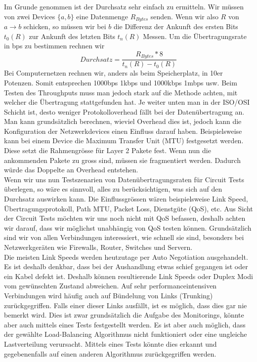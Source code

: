 \documentclass[a4,12pt]{scrartcl}
\begin{document}
\noindent Im Grunde genommen ist der Durchsatz sehr einfach zu ermitteln. Wir müssen von zwei Devices $\{a,b\}$ eine Datenmenge $R_{Bytes}$ senden. Wenn wir also $R$ von $a \rightarrow b$ schicken, so müssen wir bei $b$ die Differenz der Ankunft des ersten Bits $t_0(R)$ zur Ankunft des letzten Bits $t_n(R)$ Messen. Um die Übertragungsrate in bps zu bestimmen rechnen wir
\begin{equation}
Durchsatz = \frac{R_{Bytes} * 8}{t_n(R) - t_0(R)}  
\end{equation} 
Bei Computernetzen rechnen wir, anders als beim Speicherplatz, in 10er Potenzen. Somit entsprechen 1000bps 1kbps und 1000kbps 1mbps usw. Beim Testen des Throughputs muss man jedoch stark auf die Methode achten, mit welcher die Übertragung stattgefunden hat. Je weiter unten man in der ISO/OSI Schicht ist, desto weniger Protokolloverhead fällt bei der Datenübertragung an. Man kann grundsätzlich berechnen, wieviel Overhead dies ist, jedoch kann die Konfiguration der Netzwerkdevices einen Einfluss darauf haben. Beispielsweise kann bei einem Device die Maximum Transfer Unit (MTU) festgesetzt werden. Diese setzt die Rahmengrösse für Layer 2 Pakete fest. Wenn nun die ankommenden Pakete zu gross sind, müssen sie fragmentiert werden. Dadurch würde das Doppelte an Overhead entstehen.\\

\noindent Wenn wir uns nun Testszenarien von Datenübertragungsraten für Circuit Tests überlegen, so wäre es sinnvoll, alles zu berücksichtigen, was sich auf den Durchsatz auswirken kann. Die Einflussgrössen wären beispielsweise Link Speed, Übertragungsprotokoll, Path MTU, Packet Loss, Dienstgüte (QoS), etc. Aus Sicht der Circuit Tests möchten wir uns noch nicht mit QoS befassen, deshalb achten wir darauf, dass wir möglichst unabhängig von QoS testen können. Grundsätzlich sind wir von allen Verbindungen interessiert, wie schnell sie sind, besonders bei Netzwerkgeräten wie Firewalls, Router, Switches und Servern.\\

\noindent Die meisten Link Speeds werden heutzutage per Auto Negotiation ausgehandelt. Es ist deshalb denkbar, dass bei der Aushandlung etwas schief gegangen ist oder ein Kabel defekt ist. Deshalb können resultierende Link Speeds oder Duplex Modi vom gewünschten Zustand abweichen. Auf sehr performanceintensiven Verbindungen wird häufig auch auf Bündelung von Links (Trunking) zurückgegriffen. Falls einer dieser Links ausfällt, ist es möglich, dass dies gar nie bemerkt wird. Dies ist zwar grundsätzlich die Aufgabe des Monitorings, könnte aber auch mittels eines Tests festgestellt werden. Es ist aber auch möglich, dass der gewählte Load-Balancing Algorithmus nicht funktioniert oder eine ungleiche Lastverteilung verursacht. Mittels eines Tests könnte dies erkannt und gegebenenfalls auf einen anderen Algorithmus zurückgegriffen werden.\\
\end{document}
